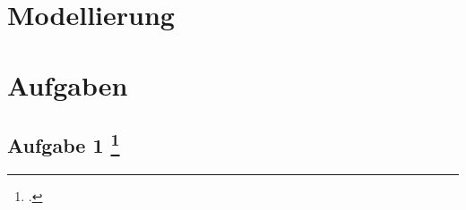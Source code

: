\documentclass{lehramt-informatik}
\begin{document}

\chapter{Modellierung}


\chapter{Aufgaben}

\section{Aufgabe 1
\footcite{sosy:ab:3}}
\end{document}
